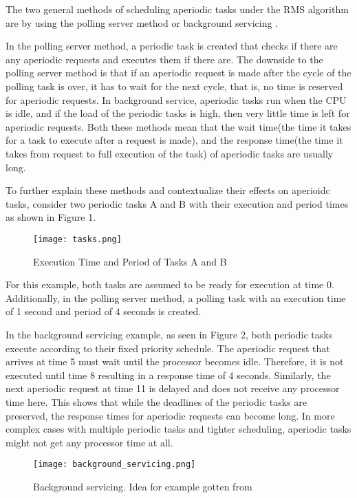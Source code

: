 \documentclass[conference]{IEEEtran}
\begin{document}
The two general methods of scheduling aperiodic tasks under the RMS algorithm are by using the polling server method or background servicing \cite{sprunt1990aperiodic}. 

In the polling server method, a periodic task is created that checks if there are any aperiodic requests and executes them if there are. The downside to the polling server method is that if an aperiodic request is made after the cycle of the polling task is over, it has to wait for the next cycle, that is, no time is reserved for aperiodic requests. In background service, aperiodic tasks run when the CPU is idle, and if the load of the periodic tasks is high, then very little time is left for aperiodic requests. Both these methods mean that the wait time(the time it takes for a task to execute after a request is made), and the response time(the time it takes from request to full execution of the task) of aperiodic tasks are usually long.


To further explain these methods and contextualize their effects on aperioidc tasks, consider two periodic tasks A and B with their execution and period times as shown in Figure 1. 

\begin{figure}[H]
  \centering
  \texttt{[image: tasks.png]} %
  \caption{Execution Time and Period of Tasks A and B}
\end{figure}

For this example, both tasks are assumed to be ready for execution at time 0. Additionally, in the polling server method, a polling task with an execution time of 1 second and period of 4 seconds is created. 

In the background servicing example, as seen in Figure 2, both periodic tasks execute according to their fixed priority schedule. The aperiodic request that arrives at time 5 must wait until the processor becomes idle. Therefore, it is not executed until time 8 resulting in a response time of 4 seconds. Similarly, the next aperiodic request at time 11 is delayed and does not receive any processor time here. 
This shows that while the deadlines of the periodic tasks are preserved, the response times for aperiodic requests  can become long. In more complex cases with multiple periodic tasks and tighter scheduling, aperiodic tasks might not get any processor time at all.
\begin{figure*}[!t]         
  \centering
  \texttt{[image: background\_servicing.png]}
  \caption{Background servicing. Idea for example gotten from \cite{sprunt1990aperiodic}}
  \label{fig:background_servicing}
\end{figure*}
\end{document}
